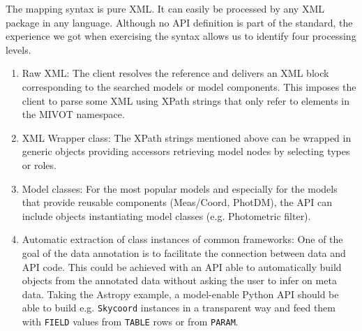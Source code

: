 The mapping syntax is pure XML. It can easily be processed by any XML package in any language.
Although no API definition is part of the standard, the experience we got when exercising the syntax allows us to identify 
four processing levels.

\begin{enumerate} 
  \item Raw XML: The client resolves the reference and delivers an XML block corresponding to the searched models or model components. 
          This imposes the client to parse some XML using XPath strings that only refer to elements in the MIVOT namespace.
  \item XML Wrapper class: The XPath strings mentioned above can be wrapped in generic objects providing accessors retrieving model nodes by selecting types or roles. 
  \item Model classes: For the most popular models and especially for the models that provide reusable components (Meas/Coord, PhotDM), the API can include objects instantiating model classes (e.g. Photometric filter).
  \item Automatic extraction of class instances of common frameworks: One of the goal of the data annotation is to facilitate the connection between data and API code. This could be achieved with an API able to automatically build objects from the annotated data without asking the user to infer on meta data. Taking the Astropy example, a model-enable Python API should be able to build e.g. \texttt{Skycoord} instances in a transparent way and feed them with \texttt{FIELD} values from \texttt{TABLE} rows or from \texttt{PARAM}.
 \end{enumerate}


